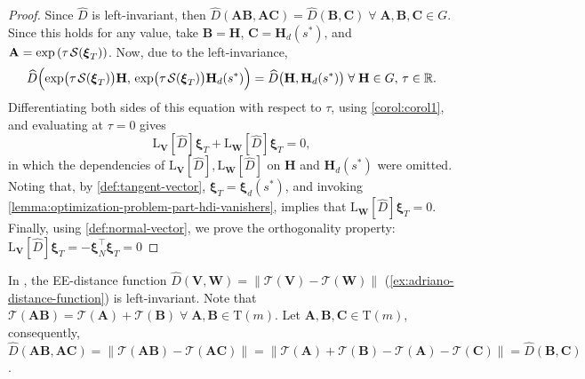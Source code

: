 \begin{proof}
    Since $\widehat{D}$ is left-invariant, then $\widehat{D}(\mathbf{A}\mathbf{B}, \mathbf{A}\mathbf{C})=\widehat{D}(\mathbf{B}, \mathbf{C})\;\forall\;\mathbf{A}, \mathbf{B}, \mathbf{C}\in G$. Since this holds for any value, take $\mathbf{B}=\mathbf{H}$, $\mathbf{C}=\mathbf{H}_d(s^*)$, and $\mathbf{A}=\exp\left(\tau\SL[\boldsymbol{\xi}_T]\right)$. Now, due to the left-invariance,
    \begin{align}
        \widehat{D}\Bigl(\exp\bigl(\tau\SL[\boldsymbol{\xi}_T]\bigr)\mathbf{H},\, \exp\bigl(\tau\SL[\boldsymbol{\xi}_T]\bigr)\mathbf{H}_d(s^*)\Bigr)
        =\widehat{D}\bigl(\mathbf{H}, \mathbf{H}_d(s^*)\bigr) \;\forall\;\mathbf{H}\in G,\,\tau\in\mathbb{R}.
    \end{align}
    Differentiating both sides of this equation with respect to $\tau$, using \cref{corol:corol1}, and evaluating at $\tau=0$ gives
    \begin{equation}
        \text{L}_{\mathbf{V}}[\widehat{D}]\boldsymbol{\xi}_T {+}\text{L}_{\mathbf{W}}[\widehat{D}]\boldsymbol{\xi}_T= 0, 
    \end{equation}
    in which the dependencies of $\text{L}_{\mathbf{V}}[\widehat{D}], \text{L}_{\mathbf{W}}[\widehat{D}]$ on $\mathbf{H}$ and $\mathbf{H}_d(s^*)$ were omitted. Noting that, by \cref{def:tangent-vector}, $\boldsymbol{\xi}_T = \boldsymbol{\xi}_d(s^*)$, and invoking \cref{lemma:optimization-problem-part-hdi-vanishers}, implies that $\text{L}_{\mathbf{W}}[\widehat{D}]\boldsymbol{\xi}_T = 0$.
    Finally, using \cref{def:normal-vector}, we prove the orthogonality property: $\text{L}_{\mathbf{V}}[\widehat{D}]\boldsymbol{\xi}_T = -\boldsymbol{\xi}_N^{\top}\boldsymbol{\xi}_T=0$ 
\end{proof}
\begin{example}
    In \citet{Rezende2022}, the  EE-distance function $\widehat{D}(\mathbf{V}, \mathbf{W}) = \|\mathcal{T}(\mathbf{V}) - \mathcal{T}(\mathbf{W})\|$ (\cref{ex:adriano-distance-function}) is left-invariant. Note that $\mathcal{T}(\mathbf{A}\mathbf{B}) = \mathcal{T}(\mathbf{A}) + \mathcal{T}(\mathbf{B})\;\forall\;\mathbf{A},\mathbf{B}\in\text{T}(m)$. Let $\mathbf{A}, \mathbf{B}, \mathbf{C} \in \text{T}(m)$, consequently, $\widehat{D}(\mathbf{A}\mathbf{B}, \mathbf{A}\mathbf{C}) = \|\mathcal{T}(\mathbf{A}\mathbf{B}) - \mathcal{T}(\mathbf{A}\mathbf{C})\| = \|\mathcal{T}(\mathbf{A}) + \mathcal{T}(\mathbf{B}) - \mathcal{T}(\mathbf{A}) - \mathcal{T}(\mathbf{C})\| = \widehat{D}(\mathbf{B}, \mathbf{C})$.
\end{example}
